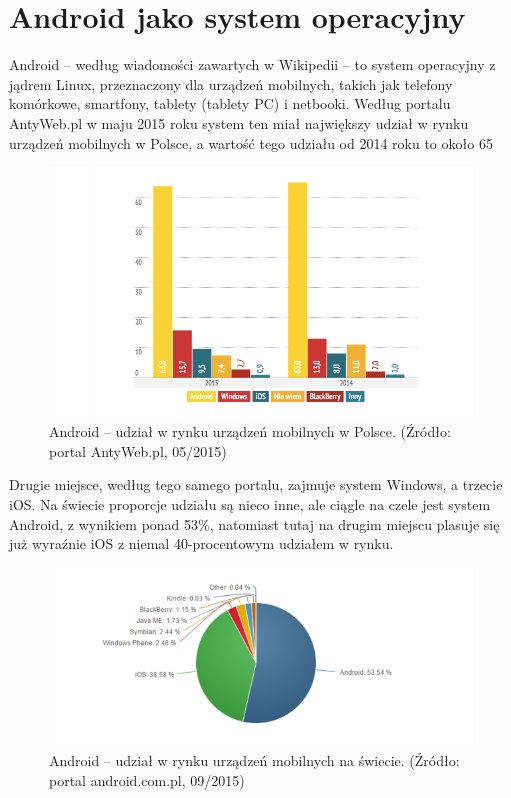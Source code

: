 \chapter{Android jako system operacyjny}

Android – według wiadomości zawartych w Wikipedii – to system operacyjny z jądrem Linux, przeznaczony dla urządzeń mobilnych, takich jak telefony komórkowe, smartfony, tablety (tablety PC) i netbooki. Według portalu AntyWeb.pl w maju 2015 roku system ten miał największy udział w rynku urządzeń mobilnych w Polsce, a wartość tego udziału od 2014 roku to około 65 %

\begin{figure}[!htb]
    \centering
    \includegraphics[width=15cm]{imgs/ch2_android_udzial_1.png}
    \caption
{Android – udział w rynku urządzeń mobilnych w Polsce. (Źródło: portal AntyWeb.pl, 05/2015)}
    \label{fig:sample_figure}
\end{figure} 

Drugie miejsce, według tego samego portalu, zajmuje system Windows, a trzecie iOS. Na świecie proporcje udziału są nieco inne, ale ciągle na czele jest system Android, z wynikiem ponad 53\%, natomiast tutaj na drugim miejscu plasuje się już wyraźnie iOS z niemal 40-procentowym udziałem w rynku.

\begin{figure}[!htb]
    \centering
    \includegraphics[width=15cm]{imgs/ch2_android_udzial_2.png}
    \caption
{Android – udział w rynku urządzeń mobilnych na świecie. (Źródło: portal android.com.pl, 09/2015)}
    \label{fig:sample_figure}
\end{figure} 

